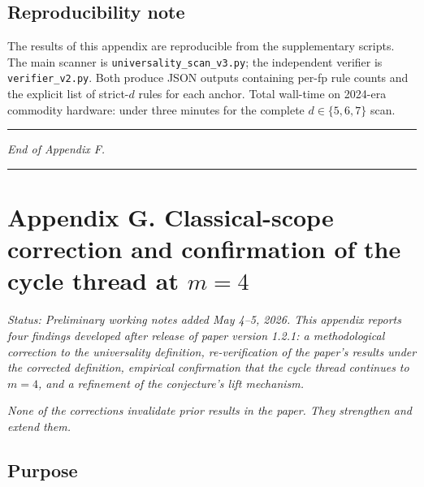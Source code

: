 \documentclass[11pt,letterpaper]{article}
\theoremstyle{paperstyle}
\theoremstyle{paperstyledef}
\theoremstyle{paperstylerem}
\begin{document}
\hypertarget{f.7-reproducibility-note}{%
\subsection{Reproducibility note}\label{f.7-reproducibility-note}}

The results of this appendix are reproducible from the supplementary
scripts. The main scanner is \texttt{universality\_scan\_v3.py}; the
independent verifier is \texttt{verifier\_v2.py}. Both produce JSON
outputs containing per-fp rule counts and the explicit list of
strict-\(d\) rules for each anchor. Total wall-time on 2024-era
commodity hardware: under three minutes for the complete
\(d \in \{5, 6, 7\}\) scan.

\begin{center}\rule{0.5\linewidth}{0.5pt}\end{center}

\emph{End of Appendix F.}

\begin{center}\rule{0.5\linewidth}{0.5pt}\end{center}

\hypertarget{appendix-g.-classical-scope-correction-and-confirmation-of-the-cycle-thread-at-m-4}{%
\section{\texorpdfstring{Appendix G. Classical-scope correction and
confirmation of the cycle thread at
\(m = 4\)}{Appendix G. Classical-scope correction and confirmation of the cycle thread at m = 4}}\label{appendix-g.-classical-scope-correction-and-confirmation-of-the-cycle-thread-at-m-4}}

\emph{Status: Preliminary working notes added May 4--5, 2026. This
appendix reports four findings developed after release of paper version
1.2.1: a methodological correction to the universality definition,
re-verification of the paper's results under the corrected definition,
empirical confirmation that the cycle thread continues to \(m = 4\), and
a refinement of the conjecture's lift mechanism.}

\emph{None of the corrections invalidate prior results in the paper.
They strengthen and extend them.}

\hypertarget{g.1-purpose}{%
\subsection{Purpose}\label{g.1-purpose}}
\end{document}
